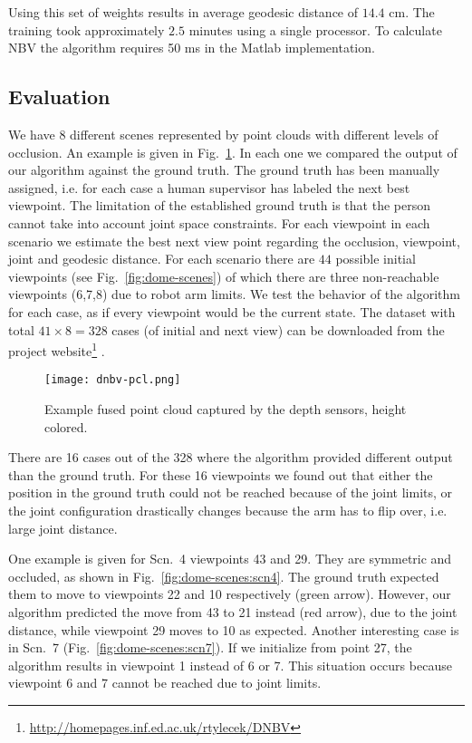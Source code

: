 \documentclass[10pt,twocolumn,letterpaper]{article}
\begin{document}
Using this set of weights results in average geodesic distance of $14.4$ cm.
The training took approximately $2.5$ minutes using a single processor. 
To calculate NBV the algorithm requires 50 ms in the Matlab implementation. 

\subsection{Evaluation}
We have 8 different scenes represented by point clouds with different levels of occlusion.
An example is given in Fig.~\ref{fig:point-cloud}. 
In each one we compared the output of our algorithm against the ground truth. 
The ground truth has been manually assigned, i.e. for each case a human supervisor has labeled the next best viewpoint. 
The limitation of the established ground truth is that the person cannot take into account joint space constraints.   
For each viewpoint in each scenario we estimate the best next view point regarding the occlusion, viewpoint, joint and geodesic distance. 
For each scenario there are $44$ possible initial viewpoints (see Fig.~\ref{fig:dome-scenes}) of which there are three non-reachable viewpoints (6,7,8) due to robot arm limits. 
We test the behavior of the algorithm for each case, as if every viewpoint would be the current state.
The dataset with total $41\times 8 = 328$ cases (of initial and next view) can be downloaded from the project website\footnote{\url{http://homepages.inf.ed.ac.uk/rtylecek/DNBV}} .

\begin{figure}
  \centering
  \texttt{[image: dnbv-pcl.png]}
  \caption{Example fused point cloud captured by the depth sensors, height colored.}
  \label{fig:point-cloud}
\end{figure}

There are 16 cases out of the 328 where the algorithm provided different output than the ground truth. 
For these 16 viewpoints we found out that either the position in the ground truth could not be reached because of the joint limits, or the joint configuration drastically changes because the arm has to flip over, i.e. large joint distance. 

One example is given for Scn.~4 viewpoints 43 and 29. 
They are symmetric and occluded, as shown in Fig.~\ref{fig:dome-scenes:scn4}. 
The ground truth expected them to move to viewpoints 22 and 10 respectively (green arrow). 
However, our algorithm predicted the move from 43 to 21 instead (red arrow), due to the joint distance, while viewpoint 29 moves to 10 as expected. 
Another interesting case is in Scn.~7 (Fig.~\ref{fig:dome-scenes:scn7}). 
If we initialize from point 27, the algorithm results in viewpoint 1 instead of 6 or 7. 
This situation occurs because viewpoint 6 and 7 cannot be reached due to joint limits.
\end{document}

